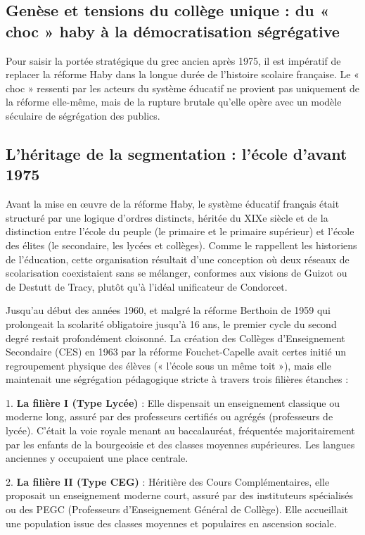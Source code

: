\subsection{Genèse et tensions du collège unique : du « choc » haby à la démocratisation ségrégative}

Pour saisir la portée stratégique du grec ancien après 1975, il est impératif de replacer la réforme
Haby dans la longue durée de l'histoire scolaire française. Le « choc » ressenti par les acteurs du
système éducatif ne provient pas uniquement de la réforme elle-même, mais de la rupture brutale
qu'elle opère avec un modèle séculaire de ségrégation des publics.



\subsection{L'héritage de la segmentation : l'école d'avant 1975}

Avant la mise en œuvre de la réforme Haby, le système éducatif français était structuré par une
logique d'ordres distincts, héritée du XIXe siècle et de la distinction entre l'école du peuple (le
primaire et le primaire supérieur) et l'école des élites (le secondaire, les lycées et collèges).
Comme le rappellent les historiens de l'éducation, cette organisation résultait d'une conception où
deux réseaux de scolarisation coexistaient sans se mélanger, conformes aux visions de Guizot ou de
Destutt de Tracy, plutôt qu'à l'idéal unificateur de Condorcet.\cite{I-3-1-ref2}

Jusqu'au début des années 1960, et malgré la réforme Berthoin de 1959 qui prolongeait la scolarité
obligatoire jusqu'à 16 ans, le premier cycle du second degré restait profondément cloisonné. La
création des Collèges d'Enseignement Secondaire (CES) en 1963 par la réforme Fouchet-Capelle avait
certes initié un regroupement physique des élèves (« l'école sous un même toit »), mais elle
maintenait une ségrégation pédagogique stricte à travers trois filières étanches :

1. \textbf{La filière I (Type Lycée)} : Elle dispensait un enseignement classique ou moderne long,
assuré par des professeurs certifiés ou agrégés (professeurs de lycée). C'était la voie royale
menant au baccalauréat, fréquentée majoritairement par les enfants de la bourgeoisie et des classes
moyennes supérieures. Les langues anciennes y occupaient une place centrale.

2. \textbf{La filière II (Type CEG)} : Héritière des Cours Complémentaires, elle proposait un
enseignement moderne court, assuré par des instituteurs spécialisés ou des PEGC (Professeurs
d'Enseignement Général de Collège). Elle accueillait une population issue des classes moyennes et
populaires en ascension sociale.

